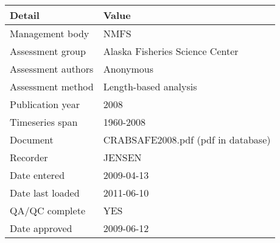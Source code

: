 \begin{table}[htb]
\centering
\begin{tabular}{lp{7cm}}
\toprule
Detail & Value \\
\midrule
Management body    & NMFS                               \\
Assessment group   & Alaska Fisheries Science Center    \\
Assessment authors & Anonymous                          \\
Assessment method  & Length-based analysis              \\
Publication year   & 2008                               \\
Timeseries span    & 1960-2008                          \\
Document           & CRABSAFE2008.pdf (pdf in database) \\
Recorder           & JENSEN                             \\
Date entered       & 2009-04-13                         \\
Date last loaded   & 2011-06-10                         \\
QA/QC complete     & YES                                \\
Date approved      & 2009-06-12                         \\
\bottomrule
\end{tabular}
\label{tab:assessdet}
\end{table}
